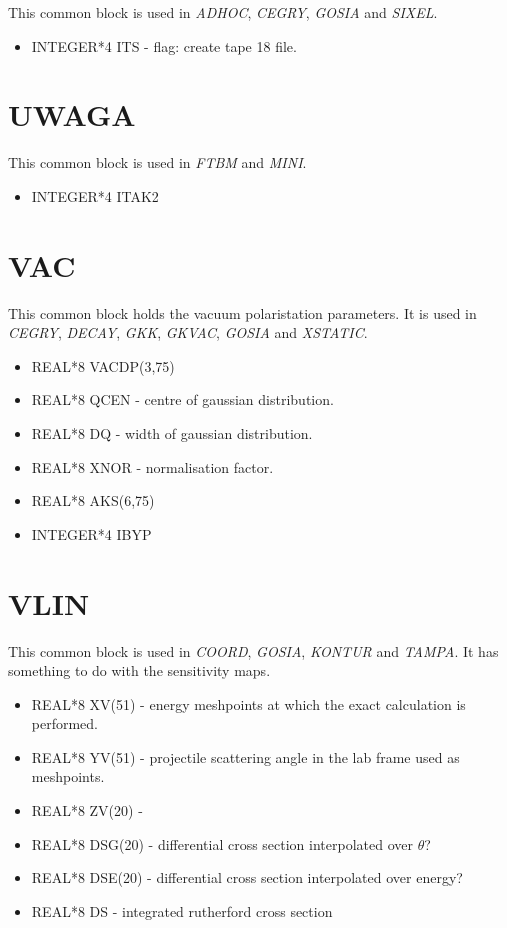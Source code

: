 This common block is used in {\em ADHOC}, {\em CEGRY}, {\em GOSIA} and {\em
SIXEL}.

\begin{itemize}
\item INTEGER*4 ITS - flag: create tape 18 file.
\end{itemize}

\section{UWAGA}

This common block is used in {\em FTBM} and {\em MINI}.

\begin{itemize}
\item INTEGER*4 ITAK2
\end{itemize}

\section{VAC}

This common block holds the vacuum polaristation parameters. It is used in
{\em CEGRY}, {\em DECAY}, {\em GKK}, {\em GKVAC}, {\em GOSIA} and {\em
XSTATIC}.

\begin{itemize}
\item REAL*8 VACDP(3,75)
\item REAL*8 QCEN - centre of gaussian distribution.
\item REAL*8 DQ - width of gaussian distribution.
\item REAL*8 XNOR - normalisation factor.
\item REAL*8 AKS(6,75)
\item INTEGER*4 IBYP
\end{itemize}

\section{VLIN}

This common block is used in {\em COORD}, {\em GOSIA}, {\em KONTUR} and {\em
TAMPA}. It has something to do with the sensitivity maps.

\begin{itemize}
\item REAL*8 XV(51) - energy meshpoints at which the exact calculation is
performed.
\item REAL*8 YV(51) - projectile scattering angle in the lab frame used as
meshpoints.
\item REAL*8 ZV(20) - 
\item REAL*8 DSG(20) - differential cross section interpolated over $\theta$?
\item REAL*8 DSE(20) - differential cross section interpolated over energy?
\item REAL*8 DS - integrated rutherford cross section
\end{itemize}

